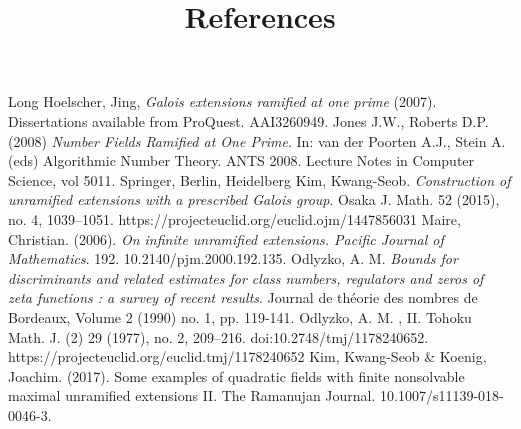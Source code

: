 \documentclass[preprint,12pt]{elsarticle}
\begin{document}

\begin{thebibliography}{9}
\title{References}
Long Hoelscher, Jing, \textit{Galois extensions ramified at one prime} (2007). Dissertations available from ProQuest. AAI3260949. 
Jones J.W., Roberts D.P. (2008) \textit{Number Fields Ramified at One Prime}. In: van der Poorten A.J., Stein A. (eds) Algorithmic Number Theory. ANTS 2008. Lecture Notes in Computer Science, vol 5011. Springer, Berlin, Heidelberg
Kim, Kwang-Seob. \textit{Construction of unramified extensions with a prescribed Galois group}. Osaka J. Math. 52 (2015), no. 4, 1039--1051. https://projecteuclid.org/euclid.ojm/1447856031
Maire, Christian. (2006). \textit{On infinite unramified extensions. Pacific Journal of Mathematics}. 192. 10.2140/pjm.2000.192.135. 
Odlyzko, A. M. \textit{Bounds for discriminants and related estimates for class numbers, regulators and zeros of zeta functions : a survey of recent results}. Journal de théorie des nombres de Bordeaux, Volume 2 (1990) no. 1, pp. 119-141. 
Odlyzko, A. M. , II. Tohoku Math. J. (2) 29 (1977), no. 2, 209--216. doi:10.2748/tmj/1178240652. https://projecteuclid.org/euclid.tmj/1178240652
Kim, Kwang-Seob & Koenig, Joachim. (2017). Some examples of quadratic fields with finite nonsolvable maximal unramified extensions II. The Ramanujan Journal. 10.1007/s11139-018-0046-3. 
\end{thebibliography}
\end{document}
